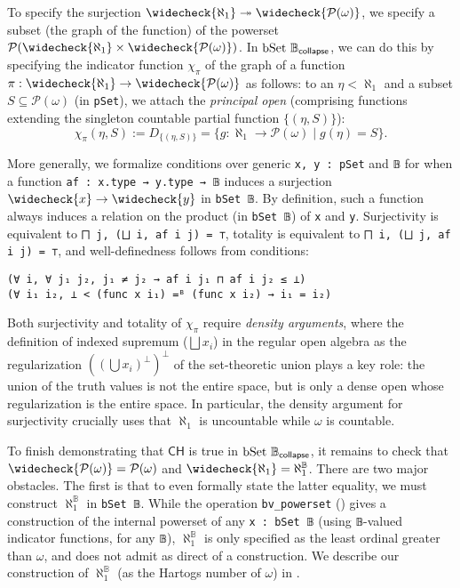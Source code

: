 \documentclass[sigplan,screen]{acmart}
\newcommand{\lil}{\lstinline}
\newcommand{\CH}{\mathsf{CH}}
\theoremstyle{definition}
\begin{document}
To specify the surjection \(\widecheck{\aleph_1} \twoheadrightarrow \widecheck{\mathcal{P}(\omega)}\), we specify a subset (the graph of the function) of the powerset \(\mathcal{P}(\widecheck{\aleph_1} \times \widecheck{\mathcal{P}(\omega)})\).
In \(\text{\lil{bSet}}\ \mathbb{B}_{\mathsf{collapse}}\), we can do this by specifying the indicator function \(\chi_{\pi}\) of the graph of a function \(\pi : \widecheck{\aleph_1} \to \widecheck{\mathcal{P}(\omega)}\) as follows: to an \(\eta < \aleph_1\) and a subset \(S \subseteq \mathcal{P}(\omega)\) (in \lil{pSet}), we attach the \emph{principal open} (comprising functions extending the singleton countable partial function \(\{(\eta, S)\}\)):
\[
  \chi_\pi (\eta, S) := D_{\{(\eta, S)\}} = \{g : \aleph_1 \to \mathcal{P}(\omega) \operatorname{|} g (\eta) = S\}.
\]

More generally, we formalize conditions over generic \lil{x, y : pSet} and \lil{𝔹} for when a function \lil{af : x.type → y.type → 𝔹} induces a surjection \(\widecheck{x} \to \widecheck{y}\) in \lil{bSet 𝔹}.
By definition, such a function always induces a relation on the product (in \lil{bSet 𝔹}) of \lil{x} and \lil{y}.
Surjectivity is equivalent to \lil{⨅ j, (⨆ i, af i j) = ⊤}, totality is equivalent to \lil{⨅ i, (⨆ j, af i j) = ⊤}, and well-definedness follows from conditions:
\begin{lstlisting}
(∀ i, ∀ j₁ j₂, j₁ ≠ j₂ → af i j₁ ⊓ af i j₂ ≤ ⊥)
(∀ i₁ i₂, ⊥ < (func x i₁) =ᴮ (func x i₂) → i₁ = i₂)
\end{lstlisting}
Both surjectivity and totality of \(\chi_{\pi}\) require \emph{density arguments}, where the definition of indexed supremum (\(\bigsqcup x_i\)) in the regular open algebra as the regularization \(((\bigcup x_i)^\perp)^\perp\) of the set-theoretic union plays a key role: the union of the truth values is not the entire space, but is only a dense open whose regularization is the entire space. In particular, the density argument for surjectivity crucially uses that \(\aleph_1\) is uncountable while \(\omega\) is countable.

To finish demonstrating that \(\CH\) is true in \(\text{\lil{bSet}}\ \mathbb{B}_{\mathsf{collapse}}\), it remains to check that \(\widecheck{\mathcal{P}(\omega)} = \mathcal{P}(\omega)\) and \(\widecheck{\aleph_1} = \aleph_1^{\mathbb{B}}\).
There are two major obstacles. The first is that to even formally state the latter equality, we must construct \(\aleph_1^{\mathbb{B}}\) in \lil{bSet 𝔹}.
While the operation \lil{bv_powerset} () gives a construction of the internal powerset of any \lil{x : bSet 𝔹} (using \lil{𝔹}-valued indicator functions, for any \lil{𝔹}), \(\aleph_1^{\mathbb{B}}\) is only specified as the least ordinal greater than \(\omega\), and does not admit as direct of a construction.
We describe our construction of \(\aleph_1^{\mathbb{B}}\) (as the Hartogs number of \(\omega\)) in .
\end{document}
